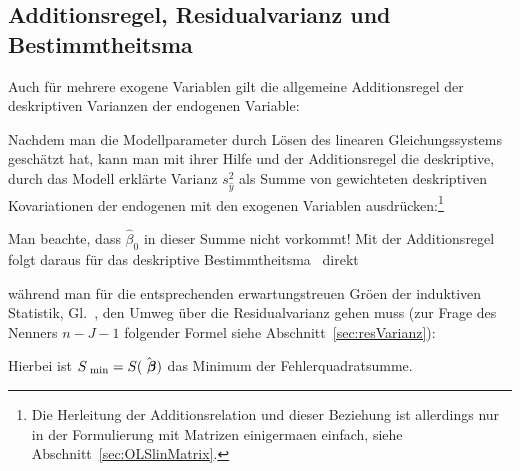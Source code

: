 \subsection{\label{sec:linB}Additionsregel, Residualvarianz und Bestimmtheitsma\3}

Auch f\"ur mehrere exogene Variablen gilt die allgemeine
Additionsregel der deskriptiven Varianzen der endogenen Variable:


Nachdem man die Modellparameter durch L\"osen des linearen
Gleichungssystems gesch\"atzt hat, kann man mit ihrer Hilfe und der
Additionsregel die
deskriptive, durch das Modell  erkl\"arte Varianz $s_{\hat{y}}^2$ als
Summe von gewichteten 
deskriptiven Kovariationen der endogenen mit den 
exogenen Variablen ausdr\"ucken:\footnote{Die Herleitung der
Additionsrelation und dieser
Beziehung ist allerdings nur in 
der Formulierung mit Matrizen einigerma\3en einfach, siehe
Abschnitt~\ref{sec:OLSlinMatrix}. 
}

Man beachte, dass $\hat{\beta}_0$ in dieser Summe nicht vorkommt!
Mit der Additionsregel  folgt daraus f\"ur das deskriptive
Bestimmtheitsma\3~ direkt

w\"ahrend man f\"ur die entsprechenden erwartungstreuen Gr\"o\3en der induktiven
Statistik, Gl.~, den Umweg \"uber die Residualvarianz
gehen muss (zur Frage des Nenners $n-J-1$ folgender Formel siehe
Abschnitt~\ref{sec:resVarianz}): 

Hierbei ist $S_{{\mbox{ {\scriptsize \hspace{-0.2ex}min}}}}=S(\hat{{\mbox{ \boldmath {$\beta$}}}})$ das Minimum der Fehlerquadratsumme.



